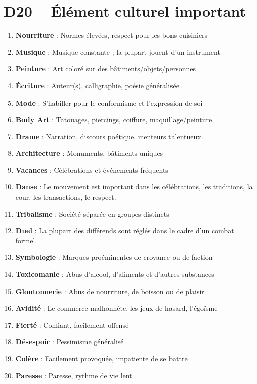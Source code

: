 \documentclass{article}
\begin{document}
\section*{D20 -- Élément culturel important }
\begin{multicols}{2}
\begin{enumerate}
	\item \textbf{Nourriture} : Normes élevées, respect pour les bons cuisiniers
	\item \textbf{Musique} : Musique constante ; la plupart jouent d'un instrument
	\item \textbf{Peinture} : Art coloré sur des bâtiments/objets/personnes
	\item \textbf{Écriture} : Auteur(s), calligraphie, poésie généralisée
	\item \textbf{Mode} : S'habiller pour le conformisme et l'expression de soi
	\item \textbf{Body Art} : Tatouages, piercings, coiffure, maquillage/peinture
	\item \textbf{Drame} : Narration, discours poétique, menteurs talentueux.
	\item \textbf{Architecture} : Monuments, bâtiments uniques
	\item \textbf{Vacances} : Célébrations et événements fréquents
	\item \textbf{Danse} : Le mouvement est important dans les célébrations, les traditions, la cour, les transactions, le respect.
	\item \textbf{Tribalisme} : Société séparée en groupes distincts
	\item \textbf{Duel} : La plupart des différends sont réglés dans le cadre d'un combat formel.
	\item \textbf{Symbologie} : Marques proéminentes de croyance ou de faction
	\item \textbf{Toxicomanie} : Abus d'alcool, d'aliments et d'autres substances
	\item \textbf{Gloutonnerie} : Abus de nourriture, de boisson ou de plaisir
	\item \textbf{Avidité} : Le commerce malhonnête, les jeux de hasard, l'égoïsme
	\item \textbf{Fierté} : Confiant, facilement offensé
	\item \textbf{Désespoir} : Pessimisme généralisé
	\item \textbf{Colère} : Facilement provoquée, impatiente de se battre
	\item \textbf{Paresse} : Paresse, rythme de vie lent
\end{enumerate}
\end{multicols}
\end{document}
